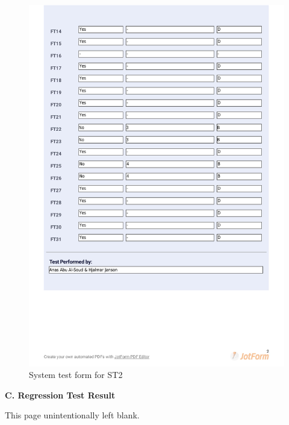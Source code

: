 \documentclass{article}
\begin{document}
 \begin{figure}
     \centering
     \includegraphics[width=13cm]{images/2021-03-04_Anas_ST3-2}
     \renewcommand\figurename{Figure}
     \caption{System test form for ST2}
     \label{fig:my_label}
 \end{figure}


\newpage
\begin{flushleft}
{\large \textbf{C. Regression Test Result}}
\end{flushleft}

\vspace*{\fill}
                \hfill
                \begin{center}
                This page unintentionally left blank.
                \end{center}
                \vspace{\fill}
                \thispagestyle{empty}
\end{document}
